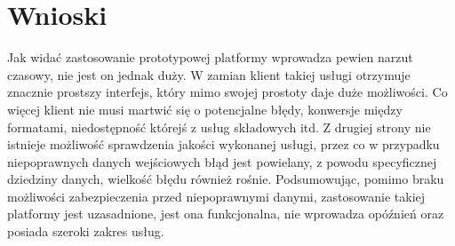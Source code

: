 \section{Wnioski}
Jak widać zastosowanie prototypowej platformy wprowadza pewien narzut czasowy, nie jest on jednak duży. W zamian klient takiej usługi otrzymuje znacznie prostszy interfejs, który mimo swojej prostoty daje duże możliwości. Co więcej klient nie musi martwić się o potencjalne błędy, konwersje między formatami, niedostępność którejś z usług składowych itd. Z drugiej strony nie istnieje możliwość sprawdzenia jakości wykonanej usługi, przez co w przypadku niepoprawnych danych wejściowych błąd jest powielany, z powodu specyficznej dziedziny danych, wielkość błędu również rośnie. Podsumowując, pomimo braku możliwości zabezpieczenia przed niepoprawnymi danymi, zastosowanie takiej platformy jest uzasadnione, jest ona funkcjonalna, nie wprowadza opóźnień oraz posiada szeroki zakres usług.

